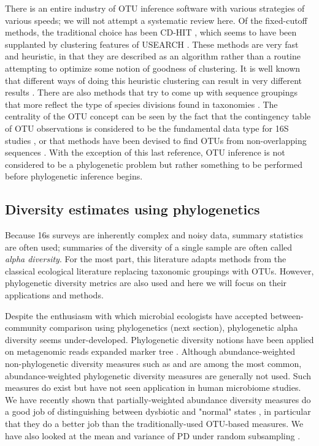 \documentclass{amsart}
\begin{document}
There is an entire industry of OTU inference software with various strategies of various speeds; we will not attempt a systematic review here.
Of the fixed-cutoff methods, the traditional choice has been CD-HIT \citep{li2006cdhit}, which seems to have been supplanted by clustering features of USEARCH \citep{edgar2010usearch}.
These methods are very fast and heuristic, in that they are described as an algorithm rather than a routine attempting to optimize some notion of goodness of clustering.
It is well known that different ways of doing this heuristic clustering can result in very different results \citep{white2010alignment}.
There are also methods that try to come up with sequence groupings that more reflect the type of species divisions found in taxonomies \citep{navlakha2009finding}.
The centrality of the OTU concept can be seen by the fact that the contingency table of OTU observations is considered to be the fundamental data type for 16S studies \citep{mcdonald2012biological}, or that methods have been devised to find OTUs from non-overlapping sequences \citep{sharpton2011phylotu}.
With the exception of this last reference, OTU inference is not considered to be a phylogenetic problem but rather something to be performed before phylogenetic inference begins.


\subsection{Diversity estimates using phylogenetics}
Because 16s surveys are inherently complex and noisy data, summary statistics are often used; summaries of the diversity of a single sample are often called \emph{alpha diversity}.
For the most part, this literature adapts methods from the classical ecological literature replacing taxonomic groupings with OTUs.
However, phylogenetic diversity metrics are also used and here we will focus on their applications and methods.

Despite the enthusiasm with which microbial ecologists have accepted between-community comparison using phylogenetics (next section), phylogenetic alpha diversity seems under-developed.
Phylogenetic diversity notions have been applied on metagenomic reads expanded marker tree \citep{kembel2011phylogenetic}.
Although abundance-weighted non-phylogenetic diversity measures such as \citet{simpson1949measurement} and \citet{shannon1948mathematical} are among the most common, abundance-weighted phylogenetic diversity measures are generally not used.
Such measures do exist \citep{rao1982diversity,barker2002phylogenetic,allen2009new,chao2010phylogenetic,vellend2011measuring} but have not seen application in human microbiome studies.
We have recently shown that partially-weighted abundance diversity measures do a good job of distinguishing between dysbiotic and "normal" states \citep{mccoy2013abundance}, in particular that they do a better job than the traditionally-used OTU-based measures.
We have also looked at the mean and variance of PD under random subsampling \citep{nipperess2013mean}.
\end{document}
